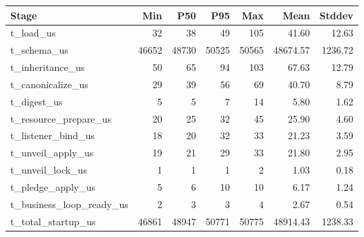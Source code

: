 \begin{tabular}{lrrrrrr}
Stage & Min & P50 & P95 & Max & Mean & Stddev \\
\hline
t\_load\_us & 32 & 38 & 49 & 105 & 41.60 & 12.63 \\
t\_schema\_us & 46652 & 48730 & 50525 & 50565 & 48674.57 & 1236.72 \\
t\_inheritance\_us & 50 & 65 & 94 & 103 & 67.63 & 12.79 \\
t\_canonicalize\_us & 29 & 39 & 56 & 69 & 40.70 & 8.79 \\
t\_digest\_us & 5 & 5 & 7 & 14 & 5.80 & 1.62 \\
t\_resource\_prepare\_us & 20 & 25 & 32 & 45 & 25.90 & 4.60 \\
t\_listener\_bind\_us & 18 & 20 & 32 & 33 & 21.23 & 3.59 \\
t\_unveil\_apply\_us & 19 & 21 & 29 & 33 & 21.80 & 2.95 \\
t\_unveil\_lock\_us & 1 & 1 & 1 & 2 & 1.03 & 0.18 \\
t\_pledge\_apply\_us & 5 & 6 & 10 & 10 & 6.17 & 1.24 \\
t\_business\_loop\_ready\_us & 2 & 3 & 3 & 4 & 2.67 & 0.54 \\
t\_total\_startup\_us & 46861 & 48947 & 50771 & 50775 & 48914.43 & 1238.33 \\
\end{tabular}
